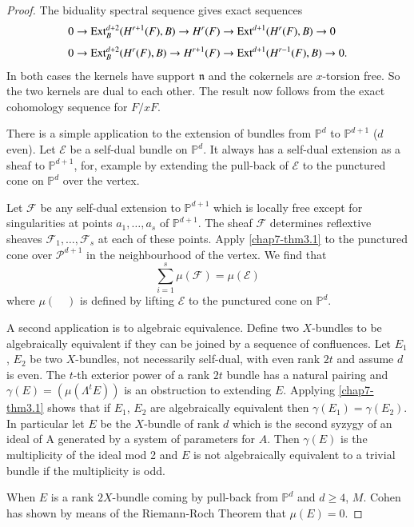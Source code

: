 \begin{proof}
The biduality spectral sequence gives exact sequences
\begin{align*}
& 0\to \operatorname{Ext}^{d+2}_{B}(H^{r+1}(F),B)\to H^{r}(F)\to \operatorname{Ext}^{d+1}(H^{r}(F),B)\to 0\\[3pt]
& 0\to \operatorname{Ext}^{d+2}_{B}(H^{r}(F),B)\to H^{r+1}(F)\to \operatorname{Ext}^{d+1}(H^{r-1}(F),B)\to 0.
\end{align*}
In both cases the kernels have support $\mathfrak{n}$ and the
cokernels are $x$-torsion free. So the two kernels are dual to each
other. The result now follows from the exact cohomology sequence for
$F/xF$. 

There is a simple application to the extension of bundles from
$\mathbb{P}^{d}$ to $\mathbb{P}^{d+1}$ ($d$ even). Let $\mathscr{E}$
be a self-dual bundle on $\mathbb{P}^{d}$. It always has a self-dual
extension as a sheaf to $\mathbb{P}^{d+1}$, for, example by extending
the pull-back of $\mathscr{E}$ to the punctured cone on
$\mathbb{P}^{d}$ over the vertex. 

Let $\mathscr{F}$ be any self-dual extension to $\mathbb{P}^{d+1}$
which is locally free except for singularities at points
$a_{1},\ldots,a_{s}$ of $\mathbb{P}^{d+1}$. The sheaf $\mathscr{F}$\pageoriginale
determines reflextive sheaves $\mathscr{F}_{1},\ldots,\mathscr{F}_{s}$
at each of these points. Apply \ref{chap7-thm3.1} to the punctured
cone over $\mathscr{P}^{d+1}$ in the neighbourhood of the vertex. We
find that
$$
\sum^{s}_{i=1}\mu (\mathscr{F})=\mu(\mathscr{E})
$$
where $\mu(\quad)$ is defined by lifting $\mathscr{E}$ to the
punctured cone on $\mathbb{P}^{d}$.

A second application is to algebraic equivalence. Define two
$X$-bundles to be algebraically equivalent if they can be joined by a
sequence of confluences. Let $E_{1}$, $E_{2}$ be two $X$-bundles, not
necessarily self-dual, with even rank $2t$ and assume $d$ is even. The
$t$-th exterior power of a rank $2t$ bundle has a natural pairing and
$\gamma(E)=(\mu(\Lambda^{t}E))$ is an obstruction to extending
$E$. Applying \ref{chap7-thm3.1} shows that if $E_{1}$, $E_{2}$ are
algebraically equivalent then $\gamma(E_{1})=\gamma(E_{2})$. In
particular let $E$ be the $X$-bundle of rank $d$ which is the second
syzygy of an ideal of A generated by a system of parameters for
$A$. Then $\gamma(E)$ is the multiplicity of the ideal mod 2 and $E$
is not algebraically equivalent to a trivial bundle if the
multiplicity is odd.

When $E$ is a rank $2X$-bundle coming by pull-back from
$\mathbb{P}^{d}$ and $d\geq 4$, $M$. Cohen has shown by means of the
Riemann-Roch Theorem that $\mu(E)=0$.
\end{proof}

